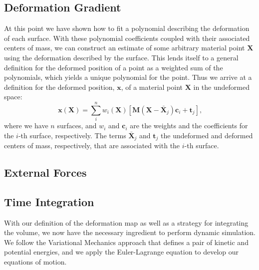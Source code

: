 \subsection{Deformation Gradient}
At this point we have shown how to fit a polynomial describing the deformation of each surface. With these polynomial coefficients coupled with their associated centers of mass, we can construct an estimate of some arbitrary material point $\mathbf{X}$ using the deformation described by the surface. This lends itself to a general definition for the deformed position of a point as a weighted sum of the polynomials, which yields a unique polynomial for the point. Thus we arrive at a definition for the deformed position, $\mathbf{x}$, of a material point $\mathbf{X}$ in the undeformed space:
\begin{equation}
\label{eqn:deformation_map}
	\mathbf{x}(\mathbf{X}) = \sum_i^n w_i(\mathbf{X}) \left[ \mathbf{M}(\mathbf{X-\bar{X}}_j)\mathbf{c}_i + \mathbf{t}_j \right]
	\text{,}
\end{equation}
where we have $n$ surfaces, and $w_i$ and $\mathbf{c}_i$ are the weights and the coefficients for the $i$-th surface, respectively. The terms $\mathbf{\bar{X}}_j$ and $\mathbf{t}_j$ the undeformed and deformed centers of mass, respectively, that are associated with the $i$-th surface.


\subsection{External Forces}
\subsection{Time Integration}
With our definition of the deformation map as well as a strategy for integrating the volume, we now have the necessary ingredient to perform dynamic simulation. We follow the Variational Mechanics approach that defines a pair of kinetic and potential energies, and we apply the Euler-Lagrange equation to develop our equations of motion.

